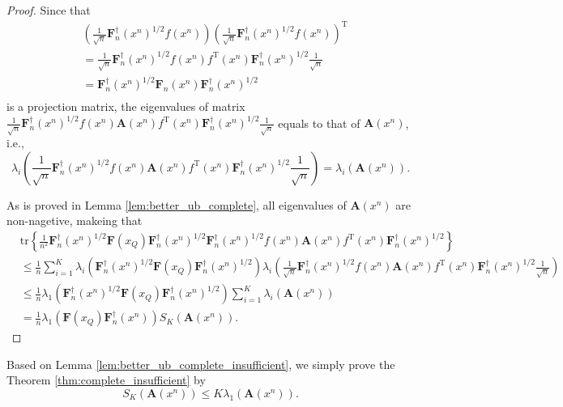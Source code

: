 \documentclass{article} %
\theoremstyle{plain} %
\begin{document}
\begin{proof}
Since that
\begin{align*}
& \left(\frac1{\sqrt{n}}\mathbf{F}_n^\dagger(x^n)^{1/2} f(x^n)\right)\left(\frac1{\sqrt{n}}\mathbf{F}_n^\dagger(x^n)^{1/2} f(x^n)\right)^\mathrm{T}\\
& = \frac1{\sqrt{n}}\mathbf{F}_n^\dagger(x^n)^{1/2} f(x^n)f^\mathrm{T}(x^n)\mathbf{F}_n^\dagger(x^n)^{1/2}\frac1{\sqrt{n}}\\
& = \mathbf{F}_n^\dagger(x^n)^{1/2}\mathbf{F}_n(x^n)\mathbf{F}_n^\dagger(x^n)^{1/2}\\
\end{align*}
is a projection matrix, the eigenvalues of matrix $\frac1{\sqrt{n}}\mathbf{F}_n^\dagger(x^n)^{1/2} f(x^n){\mathbf{A}}(x^n) f^\mathrm{T}(x^n)\mathbf{F}_n^\dagger(x^n)^{1/2}\frac1{\sqrt{n}}$ equals to that of $\mathbf{A}(x^n)$, i.e.,
\begin{equation*}
\lambda_i\left(\frac1{\sqrt{n}}\mathbf{F}_n^\dagger(x^n)^{1/2} f(x^n){\mathbf{A}}(x^n) f^\mathrm{T}(x^n)\mathbf{F}_n^\dagger(x^n)^{1/2}\frac1{\sqrt{n}}\right) = \lambda_i\left(\mathbf{A}(x^n)\right).
\end{equation*}

As is proved in Lemma \ref{lem:better_ub_complete}, all eigenvalues of $\mathbf{A}(x^n)$ are non-nagetive, makeing that
\begin{align*}
& \mathrm{tr}\left\{ \frac1{n^2}\mathbf{F}_n^\dagger(x^n)^{1/2}\mathbf{F}(x_Q)\mathbf{F}_n^\dagger(x^n)^{1/2} \mathbf{F}_n^\dagger(x^n)^{1/2} f(x^n){\mathbf{A}}(x^n) f^\mathrm{T}(x^n)\mathbf{F}_n^\dagger(x^n)^{1/2} \right\}\\
& \leq \frac1n \sum_{i=1}^K \lambda_i\left(\mathbf{F}_n^\dagger(x^n)^{1/2}\mathbf{F}(x_Q)\mathbf{F}_n^\dagger(x^n)^{1/2}\right) \lambda_i\left(\frac1{\sqrt{n}}\mathbf{F}_n^\dagger(x^n)^{1/2} f(x^n){\mathbf{A}}(x^n) f^\mathrm{T}(x^n)\mathbf{F}_n^\dagger(x^n)^{1/2}\frac1{\sqrt{n}}\right)\\
& \leq \frac1n \lambda_1\left(\mathbf{F}_n^\dagger(x^n)^{1/2}\mathbf{F}(x_Q)\mathbf{F}_n^\dagger(x^n)^{1/2}\right) \sum_{i=1}^K \lambda_i\left(\mathbf{A}(x^n)\right)\\
& = \frac1n \lambda_1\left(\mathbf{F}(x_Q)\mathbf{F}_n^{\dagger}(x^n) \right) S_K({\textbf{A}}(x^n)).
\end{align*}
\end{proof}

Based on Lemma \ref{lem:better_ub_complete_insufficient}, we simply prove the Theorem \ref{thm:complete_insufficient} by 
\begin{equation*}
    S_K({\textbf{A}}(x^n)) \leq K \lambda_1(\textbf{A}(x^n)).
\end{equation*}
\end{document}
